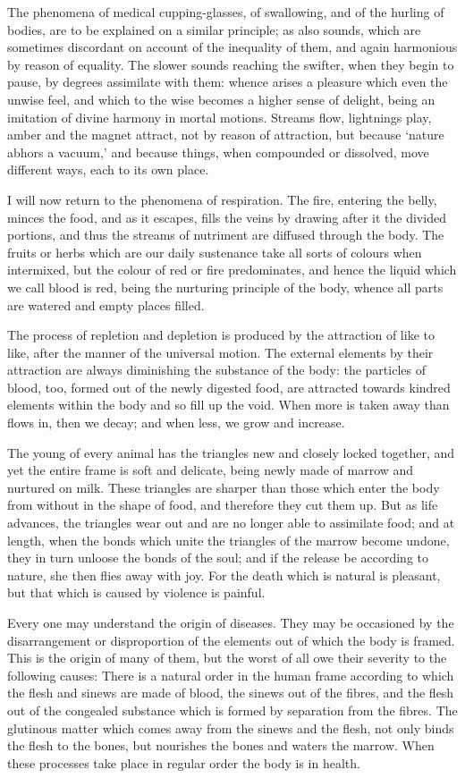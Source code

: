 The phenomena of medical cupping-glasses, of swallowing, and of the
hurling of bodies, are to be explained on a similar principle; as also
sounds, which are sometimes discordant on account of the inequality of
them, and again harmonious by reason of equality. The slower sounds
reaching the swifter, when they begin to pause, by degrees assimilate with
them: whence arises a pleasure which even the unwise feel, and which to
the wise becomes a higher sense of delight, being an imitation of divine
harmony in mortal motions. Streams flow, lightnings play, amber and the
magnet attract, not by reason of attraction, but because ‘nature abhors a
vacuum,’ and because things, when compounded or dissolved, move different
ways, each to its own place.

I will now return to the phenomena of respiration. The fire, entering the
belly, minces the food, and as it escapes, fills the veins by drawing
after it the divided portions, and thus the streams of nutriment are
diffused through the body. The fruits or herbs which are our daily
sustenance take all sorts of colours when intermixed, but the colour of
red or fire predominates, and hence the liquid which we call blood is red,
being the nurturing principle of the body, whence all parts are watered
and empty places filled.

The process of repletion and depletion is produced by the attraction of
like to like, after the manner of the universal motion. The external
elements by their attraction are always diminishing the substance of the
body: the particles of blood, too, formed out of the newly digested food,
are attracted towards kindred elements within the body and so fill up the
void. When more is taken away than flows in, then we decay; and when less,
we grow and increase.

The young of every animal has the triangles new and closely locked
together, and yet the entire frame is soft and delicate, being newly made
of marrow and nurtured on milk. These triangles are sharper than those
which enter the body from without in the shape of food, and therefore they
cut them up. But as life advances, the triangles wear out and are no
longer able to assimilate food; and at length, when the bonds which unite
the triangles of the marrow become undone, they in turn unloose the bonds
of the soul; and if the release be according to nature, she then flies
away with joy. For the death which is natural is pleasant, but that which
is caused by violence is painful.

Every one may understand the origin of diseases. They may be occasioned by
the disarrangement or disproportion of the elements out of which the body
is framed. This is the origin of many of them, but the worst of all owe
their severity to the following causes: There is a natural order in the
human frame according to which the flesh and sinews are made of blood, the
sinews out of the fibres, and the flesh out of the congealed substance
which is formed by separation from the fibres. The glutinous matter which
comes away from the sinews and the flesh, not only binds the flesh to the
bones, but nourishes the bones and waters the marrow. When these processes
take place in regular order the body is in health.

